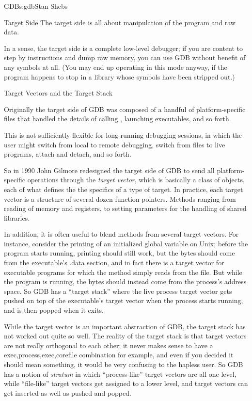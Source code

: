 \begin{aosachapter}{GDB}{s:gdb}{Stan Shebs}
\begin{aosasect1}{Target Side}
The target side is all about manipulation of the program and raw data.

In a sense, the target side is a complete low-level debugger; if you
are content to step by instructions and dump raw memory, you can use
GDB without benefit of any symbols at all.  (You may end up operating
in this mode anyway, if the program happens to stop in a library whose
symbols have been stripped out.)

\begin{aosasect2}{Target Vectors and the Target Stack}

Originally the target side of GDB was composed of a handful of
platform-specific files that handled the details of calling
, launching executables, and so forth.

This is not sufficiently flexible for long-running debugging sessions,
in which the user might switch from local to remote debugging, switch
from files to live programs, attach and detach, and so forth.

So in 1990 John Gilmore redesigned the target side of GDB to send all
platform-specific operations through the {\em target vector}, which is
basically a class of objects, each of what defines the the specifics
of a type of target.  In practice, each target vector is a structure
of several dozen function pointers.  Methods ranging from reading of
memory and registers, to setting parameters for the handling of shared
libraries.

In addition, it is often useful to blend methods from several target
vectors.  For instance, consider the printing of an initialized global
variable on Unix; before the program starts running, printing should
still work, but the bytes should come from the executable's .data
section, and in fact there is a target vector for executable programs
for which the method simply reads from the file.  But while the
program is running, the bytes should instead come from the process's
address space.  So GDB has a ``target stack'' where the live process
target vector gets pushed on top of the executable's target vector
when the process starts running, and is then popped when it exits.


While the target vector is an important abstraction of GDB, the target
stack has not worked out quite so well.  The reality of the target
stack is that target vectors are not really orthogonal to each other;
it never makes sense to have a exec,process,exec,corefile combination
for example, and even if you decided it should mean something, it
would be very confusing to the hapless user.  So GDB has a notion of
{\em stratum} in which ``process-like'' target vectors are all one level,
while ``file-like'' target vectors get assigned to a lower level, and
target vectors can get inserted as well as pushed and popped.


\end{aosasect2}
\end{aosasect1}
\end{aosachapter}
